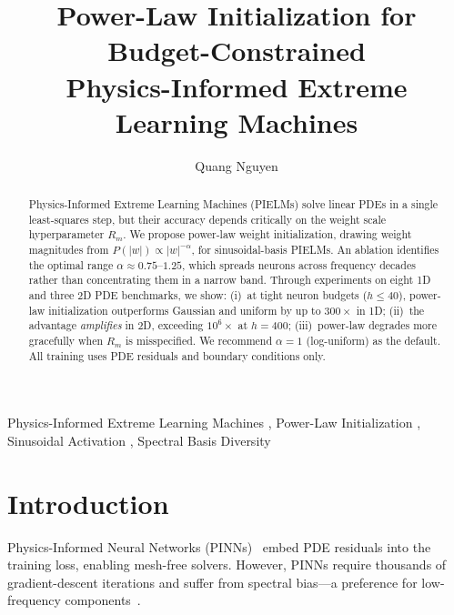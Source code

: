 \documentclass[final,12pt,3p,times,fleqn]{elsarticle}
\begin{document}
\begin{frontmatter}

\title{Power-Law Initialization for Budget-Constrained\\Physics-Informed Extreme Learning Machines}

\author[1,2]{Quang Nguyen}

\address[1]{Department of Physics, International University, Ho Chi Minh City, Vietnam}
\address[2]{Viet Nam National University Ho Chi Minh City, Vietnam}


\begin{abstract}
Physics-Informed Extreme Learning Machines (PIELMs) solve linear PDEs in a single least-squares step, but their accuracy depends critically on the weight scale hyperparameter $R_m$. We propose power-law weight initialization, drawing weight magnitudes from $P(|w|) \propto |w|^{-\alpha}$, for sinusoidal-basis PIELMs. An ablation identifies the optimal range $\alpha \approx 0.75$--$1.25$, which spreads neurons across frequency decades rather than concentrating them in a narrow band. Through experiments on eight 1D and three 2D PDE benchmarks, we show: (i)~at tight neuron budgets ($h \leq 40$), power-law initialization outperforms Gaussian and uniform by up to $300\times$ in 1D; (ii)~the advantage \emph{amplifies} in 2D, exceeding $10^6\times$ at $h = 400$; (iii)~power-law degrades more gracefully when $R_m$ is misspecified. We recommend $\alpha = 1$ (log-uniform) as the default. All training uses PDE residuals and boundary conditions only.
\end{abstract}

\begin{keyword}
Physics-Informed Extreme Learning Machines \sep
Power-Law Initialization \sep
Sinusoidal Activation \sep
Spectral Basis Diversity
\end{keyword}

\end{frontmatter}


\section{Introduction}
\label{sec:intro}

Physics-Informed Neural Networks (PINNs)~\cite{raissi2019physics} embed PDE residuals into the training loss, enabling mesh-free solvers. However, PINNs require thousands of gradient-descent iterations and suffer from spectral bias---a preference for low-frequency components~\cite{rahaman2019spectral,wang2022pinns}.
\end{document}
